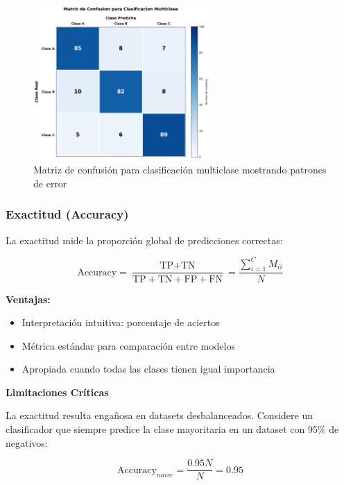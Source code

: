\begin{figure}[h]
\centering
\includegraphics[width=0.6\textwidth]{imagenes/matriz_confusion_ejemplo.png}
\caption{Matriz de confusión para clasificación multiclase mostrando patrones de error}
\label{fig:matriz_confusion}
\end{figure}

\subsubsection{Exactitud (Accuracy)}

La exactitud mide la proporción global de predicciones correctas:

\begin{equation}
\text{Accuracy} = \frac{\text{TP} + \text{TN}}{\text{TP} + \text{TN} + \text{FP} + \text{FN}} = \frac{\sum_{i=1}^{C} M_{ii}}{N}
\end{equation}

\textbf{Ventajas:}
\begin{itemize}
\item Interpretación intuitiva: porcentaje de aciertos
\item Métrica estándar para comparación entre modelos
\item Apropiada cuando todas las clases tienen igual importancia
\end{itemize}

\textbf{Limitaciones Críticas}

La exactitud resulta engañosa en datasets desbalanceados. Considere un clasificador que siempre predice la clase mayoritaria en un dataset con 95\% de negativos:

\begin{equation}
\text{Accuracy}_{naive} = \frac{0.95N}{N} = 0.95
\end{equation}

